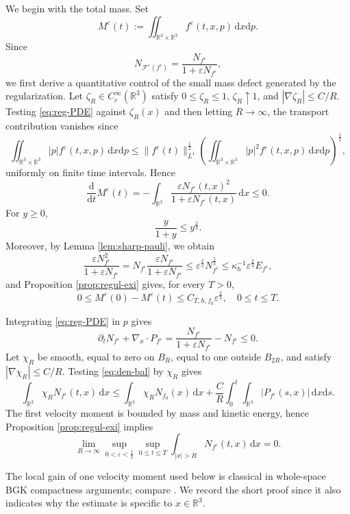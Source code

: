 \documentclass[10pt,reqno]{amsart}
\numberwithin{equation}{section}
\theoremstyle{definition}
\newcommand{\R}{\mathbb R}
\newcommand{\dd}{\mathrm d}
\newcommand{\dx}{\mathrm{d}x}
\newcommand{\dpp}{\mathrm{d}p}
\newcommand{\ds}{\mathrm{d}s}
\newcommand{\kappah}{\kappa_{\hbar}}
\newcommand{\e}{\varepsilon}
\newcommand{\calF}{\mathcal F}
\newcommand{\bq}{\begin{equation}}
\newcommand{\eq}{\end{equation}}
\newcommand{\lt}{\left}
\newcommand{\rt}{\right}
\newcommand{\pa}{\partial}
\begin{document}
We begin with the total mass. Set
\[
 M^\e(t):=\iint_{\R^3\times\R^3}f^\e(t,x,p)\,\dx\dpp.
\]
Since
\[
 N_{\calF^\e(f^\e)}=\frac{N_{f^\e}}{1+\e N_{f^\e}},
\]
we first derive a quantitative control of the small mass defect generated by the regularization. 
Let $\zeta_R\in C_c^\infty(\R^3)$ satisfy $0\leq\zeta_R\leq1$, $\zeta_R\uparrow1$, and $|\nabla\zeta_R|\leq C/R$.  Testing \eqref{eq:reg-PDE} against $\zeta_R(x)$ and then letting $R\to\infty$, the transport contribution vanishes since
\[
 \iint_{\R^3\times\R^3}|p|f^\e(t,x,p)\,\dx\dpp  \leq \|f^\e(t)\|_{L^1}^{\frac12}  \lt(\iint_{\R^3\times\R^3}|p|^2f^\e(t,x,p)\,\dx\dpp\rt)^{\frac12},
\]
uniformly on finite time intervals.  Hence
\[
 \frac{\dd}{\dd t}M^\e(t)  =-\int_{\R^3}\frac{\e N_{f^\e}(t,x)^2}  {1+\e N_{f^\e}(t,x)}\,\dx  \leq0.
\]
For $y\geq0$,
\[
 \frac{y}{1+y}\leq y^{\frac23}.
\]
Moreover, by Lemma \ref{lem:sharp-pauli}, we obtain
\[
 \frac{\e N_{f^\e}^2}{1+\e N_{f^\e}}  =N_{f^\e}\frac{\e N_{f^\e}}{1+\e N_{f^\e}}  \leq \e^{\frac23}N_{f^\e}^{\frac53}  \leq \kappah^{-1}\e^{\frac23}E_{f^\e},
\]
and Proposition \ref{prop:regul-exi} gives, for every $T>0$,
\bq \label{eq:m-loss-s}
 0\leq M^\e(0)-M^\e(t)  \leq C_{T,\hbar,f_0}\e^{\frac23},  \quad 0\leq t\leq T.
\eq

Integrating \eqref{eq:reg-PDE} in $p$ gives
\bq \label{eq:den-bal}
\pa_tN_{f^\e}+\nabla_x\cdot P_{f^\e}  =\frac{N_{f^\e}}{1+\e N_{f^\e}}-N_{f^\e}  \leq0.
\eq
Let $\chi_R$ be smooth, equal to zero on $B_R$, equal to one outside $B_{2R}$, and satisfy $|\nabla\chi_R|\leq C/R$.  Testing \eqref{eq:den-bal} by $\chi_R$ gives
\[
 \int_{\R^3}\chi_RN_{f^\e}(t,x)\,\dx  \leq\int_{\R^3}\chi_RN_{f_0}(x)\,\dx  +\frac{C}{R}\int_0^t\int_{\R^3}|P_{f^\e}(s,x)|\,\dx\ds.
\]
The first velocity moment is bounded by mass and kinetic energy, hence Proposition \ref{prop:regul-exi} implies
\bq \label{eq:spa-tig}
 \lim_{R\to\infty}  \sup_{0<\e<\frac12}\sup_{0\leq t\leq T}  \int_{|x|>R}N_{f^\e}(t,x)\,\dx=0.
\eq

The local gain of one velocity moment used below is classical in whole-space BGK compactness arguments; compare \cite{Per89}.  We record the short proof since it also indicates why the estimate is specific to $x\in\R^3$.
\end{document}

